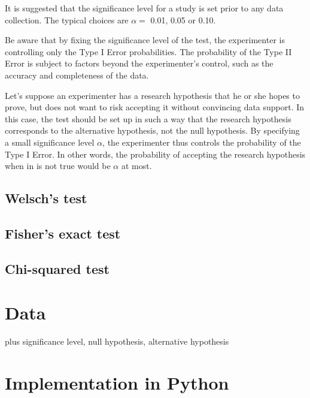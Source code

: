 It is suggested that the significance level for a study is set prior to any data collection. \cite{neynman_pearson}
The typical choices are $\alpha =$ 0.01, 0.05 or 0.10. \cite{casella}

Be aware that by fixing the significance level of the test, the experimenter is controlling only the Type I Error probabilities. The probability of the Type II Error is subject to factors beyond the experimenter's control, such as the accuracy and completeness of the data. \cite{sham_purcell}

Let's suppose an experimenter has a research hypothesis that he or she hopes to prove, but does not want to risk accepting it without convincing data support. In this case, the test should be set up in such a way that the research hypothesis corresponds to the alternative hypothesis, not the null hypothesis. By specifying a small significance level $\alpha$, the experimenter thus controls the probability of the Type I Error. In other words, the probability of accepting the research hypothesis when in is not true would be $\alpha$ at most. \cite{casella}




\subsection{Welsch's test}

\subsection{Fisher's exact test}

\subsection{Chi-squared test}


\section{Data}
plus significance level, null hypothesis, alternative hypothesis


\section{Implementation in Python}


